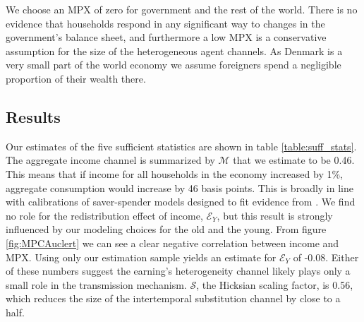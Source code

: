 \documentclass[titlepage]{\econtex}\newcommand{\texname}{ConsumptionHeterogeneity}
\begin{document}
We choose an MPX of zero for government and the rest of the world. There is no evidence that households respond in any significant way to changes in the government's balance sheet, and furthermore a low MPX is a conservative assumption for the size of the heterogeneous agent channels. As Denmark is a very small part of the world economy we assume foreigners spend a negligible proportion of their wealth there.
\begin{center}
	\label{table:aggElas}
	
\end{center}

\subsection{Results}
Our estimates of the five sufficient statistics are shown in table \ref{table:suff_stats}. The aggregate income channel is summarized by $\mathcal{M}$ that we estimate to be 0.46. This means that if income for all households in the economy increased by 1\%, aggregate consumption would increase by 46 basis points. This is broadly in line with calibrations of saver-spender models designed to fit evidence from \cite{campbell_consumption_1989}. We find no role for the redistribution effect of income, $\mathcal{E}_Y$, but this result is strongly influenced by our modeling choices for the old and the young. From figure \ref{fig:MPCAuclert} we can see a clear negative correlation between income and MPX. Using only our estimation sample yields an estimate for $\mathcal{E}_Y$ of -0.08. Either of these numbers suggest the earning's heterogeneity channel likely plays only a small role in the transmission mechanism. $\mathcal{S}$, the Hicksian scaling factor, is 0.56, which reduces the size of the intertemporal substitution channel by close to a half.
\end{document}

